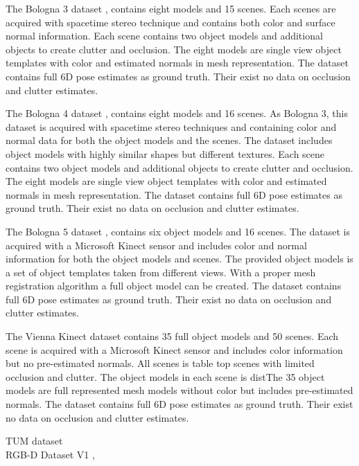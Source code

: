 \documentclass[10pt,twocolumn,letterpaper]{article}
\begin{document}
The Bologna 3 dataset \cite{Salti2014}, \cite{Tombari2010} contains eight models and 15 scenes. Each scenes are acquired with spacetime stereo technique and contains both color and surface normal information. Each scene contains two object models and additional objects to create clutter and occlusion. The eight models are single view object templates with color and estimated normals in mesh representation. The dataset contains full 6D pose estimates as ground truth. Their exist no data on occlusion and clutter estimates.

The Bologna 4 dataset \cite{Salti2014}, \cite{Tombari2010} contains eight models and 16 scenes. As Bologna 3, this dataset is acquired with spacetime stereo techniques and containing color and normal data for both the object models and the scenes. The dataset includes object models with highly similar shapes but different textures. Each scene contains two object models and additional objects to create clutter and occlusion. The eight models are single view object templates with color and estimated normals in mesh representation. The dataset contains full 6D pose estimates as ground truth. Their exist no data on occlusion and clutter estimates.

The Bologna 5 dataset \cite{Salti2014}, \cite{Tombari2010} contains six object models and 16 scenes. The dataset is acquired with a Microsoft Kinect sensor and includes color and normal information for both the object models and scenes. The provided object models is a set of object templates taken from different views. With a proper mesh registration algorithm a full object model can be created. The dataset contains full 6D pose estimates as ground truth. Their exist no data on occlusion and clutter estimates.

The Vienna Kinect dataset \cite{Aldoma2012} contains 35 full object models and 50 scenes. Each scene is acquired with a Microsoft Kinect sensor and includes color information but no pre-estimated normals. All scenes is table top scenes with limited occlusion and clutter. The object models in each scene is distThe 35 object models are full represented mesh models without color but includes pre-estimated normals. 
The dataset contains full 6D pose estimates as ground truth. Their exist no data on occlusion and clutter estimates.

TUM dataset \cite{Rodola2013}\\

RGB-D Dataset V1 \cite{Lai2011}, \cite{Lai2012}\\ 
\end{document}
